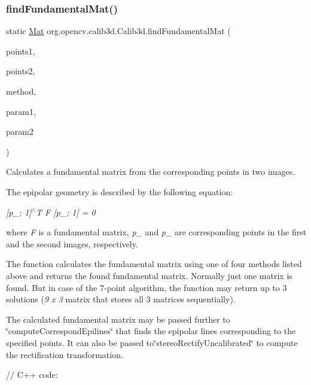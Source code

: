 \subsubsection{\texorpdfstring{find\+Fundamental\+Mat()}{findFundamentalMat()}\hspace{0.1cm}{\footnotesize\ttfamily [2/3]}}
{\footnotesize\ttfamily static \mbox{\hyperlink{classorg_1_1opencv_1_1core_1_1_mat}{Mat}} org.\+opencv.\+calib3d.\+Calib3d.\+find\+Fundamental\+Mat (\begin{DoxyParamCaption}\item[{\mbox{\hyperlink{classorg_1_1opencv_1_1core_1_1_mat_of_point2f}{Mat\+Of\+Point2f}}}]{points1,  }\item[{\mbox{\hyperlink{classorg_1_1opencv_1_1core_1_1_mat_of_point2f}{Mat\+Of\+Point2f}}}]{points2,  }\item[{int}]{method,  }\item[{double}]{param1,  }\item[{double}]{param2 }\end{DoxyParamCaption})\hspace{0.3cm}{\ttfamily [static]}}

Calculates a fundamental matrix from the corresponding points in two images.

The epipolar geometry is described by the following equation\+:

{\itshape \mbox{[}p\+\_; 1\mbox{]}$^\wedge$T F \mbox{[}p\+\_; 1\mbox{]} = 0}

where {\itshape F} is a fundamental matrix, {\itshape p\+\_} and {\itshape p\+\_} are corresponding points in the first and the second images, respectively.

The function calculates the fundamental matrix using one of four methods listed above and returns the found fundamental matrix. Normally just one matrix is found. But in case of the 7-\/point algorithm, the function may return up to 3 solutions ({\itshape 9 x 3} matrix that stores all 3 matrices sequentially).

The calculated fundamental matrix may be passed further to \char`\"{}compute\+Correspond\+Epilines\char`\"{} that finds the epipolar lines corresponding to the specified points. It can also be passed to\char`\"{}stereo\+Rectify\+Uncalibrated\char`\"{} to compute the rectification transformation. {\ttfamily }

{\ttfamily }

{\ttfamily }

{\ttfamily // C++ code\+:}

